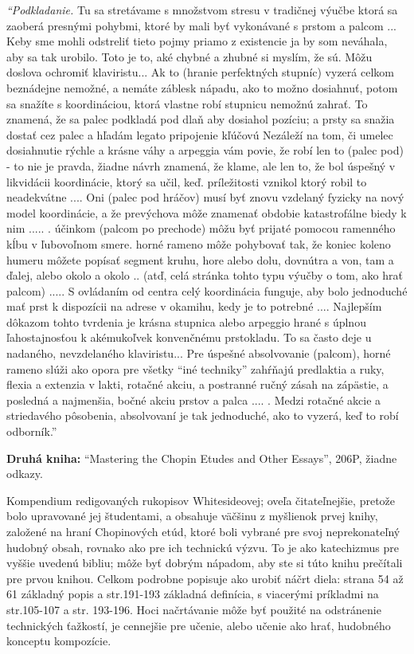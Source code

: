 \documentclass[11pt,a4paper]{book}
\begin{document}
\textit{“Podkladanie.} Tu sa stretávame s množstvom stresu v tradičnej výučbe ktorá sa zaoberá presnými pohybmi, ktoré by mali byť vykonávané s prstom a palcom ... Keby sme mohli odstreliť tieto pojmy priamo z existencie ja by som neváhala, aby sa tak urobilo. Toto je to, aké chybné a zhubné si myslím, že sú. Môžu doslova ochromiť klaviristu... Ak to (hranie perfektných stupníc) vyzerá celkom beznádejne nemožné, a nemáte záblesk nápadu, ako to možno dosiahnuť, potom sa snažíte s koordináciou, ktorá vlastne robí stupnicu nemožnú zahrať. To znamená, že sa palec podkladá pod dlaň aby dosiahol pozíciu; a prsty sa snažia dostať cez palec a hľadám legato pripojenie kľúčovú Nezáleží na tom, či umelec dosiahnutie rýchle a krásne váhy a arpeggia vám povie, že robí len to (palec pod) - to nie je pravda, žiadne návrh znamená, že klame, ale len to, že bol úspešný v likvidácii koordinácie, ktorý sa učil, keď. príležitosti vznikol ktorý robil to neadekvátne .... Oni (palec pod hráčov) musí byť znovu vzdelaný fyzicky na nový model koordinácie, a že prevýchova môže znamenať obdobie katastrofálne biedy k nim ..... . účinkom (palcom po prechode) môžu byť prijaté pomocou ramenného kĺbu v ľubovoľnom smere. horné rameno môže pohybovať tak, že koniec koleno humeru môžete popísať segment kruhu, hore alebo dolu, dovnútra a von, tam a ďalej, alebo okolo a okolo .. (atď, celá stránka tohto typu výučby o tom, ako hrať palcom) ..... S ovládaním od centra celý koordinácia funguje, aby bolo jednoduché mať prst k dispozícii na adrese v okamihu, kedy je to potrebné .... Najlepším dôkazom tohto tvrdenia je krásna stupnica alebo arpeggio hrané s úplnou ľahostajnosťou k akémukoľvek konvenčnému prstokladu. To sa často deje u nadaného, nevzdelaného klaviristu... Pre úspešné absolvovanie (palcom), horné rameno slúži ako opora pre všetky “iné techniky” zahŕňajú predlaktia a ruky, flexia a extenzia v lakti, rotačné akciu, a postranné ručný zásah na zápästie, a posledná a najmenšia, bočné akciu prstov a palca .... . Medzi rotačné akcie a striedavého pôsobenia, absolvovaní je tak jednoduché, ako to vyzerá, keď to robí odborník.” 

\textbf{Druhá kniha:} “Mastering the Chopin Etudes and Other Essays”, 206P, žiadne odkazy. 

Kompendium redigovaných rukopisov Whitesideovej; oveľa čitateľnejšie, pretože bolo upravované jej študentami, a obsahuje väčšinu z myšlienok prvej knihy, založené na hraní Chopinových etúd, ktoré boli vybrané pre svoj neprekonateľný hudobný obsah, rovnako ako pre ich technickú výzvu. To je ako katechizmus pre vyššie uvedenú bibliu; môže byť dobrým nápadom, aby ste si túto knihu prečítali pre prvou knihou. Celkom podrobne popisuje ako urobiť náčrt diela: strana 54 až 61 základný popis a str.191-193 základná definícia, s viacerými príkladmi na str.105-107 a str. 193-196. Hoci načrtávanie môže byť použité na odstránenie technických ťažkostí, je cennejšie pre učenie, alebo učenie ako hrať, hudobného konceptu kompozície. 
\end{document}
